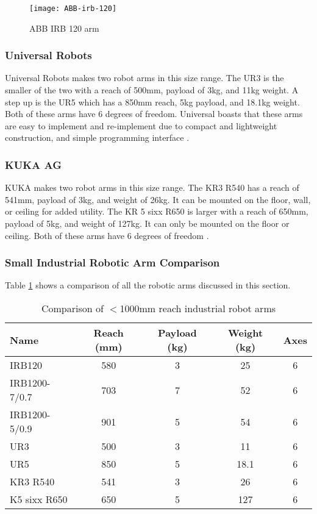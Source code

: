\begin{figure}[H]
\centering
\texttt{[image: ABB-irb-120]}
\caption{ABB IRB 120 arm \cite{IRB_120}}
\label{fig:abb-irb-120}
\end{figure}

\subsubsection{Universal Robots}
Universal Robots makes two robot arms in this size range. The UR3 is the smaller of the two with a reach of 500mm, payload of 3kg, and 11kg weight. A step up is the UR5 which has a 850mm reach, 5kg payload, and 18.1kg weight. Both of these arms have 6 degrees of freedom. Universal boasts that these arms are easy to implement and re-implement due to compact and lightweight construction, and simple programming interface \cite{RobotWorx}.

\subsubsection{KUKA AG}
KUKA makes two robot arms in this size range. The KR3 R540 has a reach of 541mm, payload of 3kg, and weight of 26kg. It can be mounted on the floor, wall, or ceiling for added utility. The KR 5 sixx R650 is larger with a reach of 650mm, payload of 5kg, and weight of 127kg. It can only be mounted on the floor or ceiling. Both of these arms have 6 degrees of freedom \cite{RobotWorx}.

\subsubsection{Small Industrial Robotic Arm Comparison}
Table \ref{tab:ArmComparison} shows a comparison of all the robotic arms discussed in this section.
\begin{table} [H]
	\centering
	\caption{Comparison of $<$1000mm reach industrial robot arms}
	\label{tab:ArmComparison}
	\begin{tabular}{| l | c | c | c | c |}
		\hline
		\textbf{Name} & \textbf{Reach (mm)} & \textbf{Payload (kg)} & \textbf{Weight (kg)} & \textbf{Axes} \\
		\hline
		IRB120 & 580 & 3 & 25 & 6 \\
		IRB1200-7/0.7 & 703 & 7 & 52 & 6 \\
		IRB1200-5/0.9 & 901 & 5 & 54 & 6 \\
		UR3 & 500 & 3 & 11 & 6 \\
		UR5 & 850 & 5 & 18.1 & 6 \\
		KR3 R540 & 541 & 3 & 26 & 6 \\
		K5 sixx R650 & 650 & 5 & 127 & 6 \\
		\hline
	\end{tabular}
\end{table}

